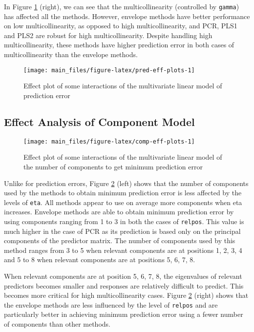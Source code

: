 \documentclass[review]{elsarticle}
\begin{document}
In Figure \ref{fig:pred-eff-plots} (right), we can see that the multicollinearity (controlled by \texttt{gamma}) has affected all the methods. However, envelope methods have better performance on low multicollinearity, as opposed to high multicollinearity, and PCR, PLS1 and PLS2 are robust for high multicollinearity. Despite handling high multicollinearity, these methods have higher prediction error in both cases of multicollinearity than the envelope methods.



\begin{figure}
\texttt{[image: main\_files/figure-latex/pred-eff-plots-1]} \caption{Effect plot of some interactions of the multivariate linear model of prediction error}\label{fig:pred-eff-plots}
\end{figure}

\hypertarget{effect-analysis-of-component-model}{%
\subsection{Effect Analysis of Component Model}\label{effect-analysis-of-component-model}}



\begin{figure}[!htb]
\texttt{[image: main\_files/figure-latex/comp-eff-plots-1]} \caption{Effect plot of some interactions of the multivariate linear model of the number of components to get minimum prediction error}\label{fig:comp-eff-plots}
\end{figure}

Unlike for prediction errors, Figure \ref{fig:comp-eff-plots} (left) shows that the number of components used by the methods to obtain minimum prediction error is less affected by the levels of \texttt{eta}. All methods appear to use on average more components when eta increases. Envelope methods are able to obtain minimum prediction error by using components ranging from 1 to 3 in both the cases of \texttt{relpos}. This value is much higher in the case of PCR as its prediction is based only on the principal components of the predictor matrix. The number of components used by this method ranges from 3 to 5 when relevant components are at positions 1, 2, 3, 4 and 5 to 8 when relevant components are at positions 5, 6, 7, 8.

When relevant components are at position 5, 6, 7, 8, the eigenvalues of relevant predictors becomes smaller and responses are relatively difficult to predict. This becomes more critical for high multicollinearity cases. Figure \ref{fig:comp-eff-plots} (right) shows that the envelope methods are less influenced by the level of \texttt{relpos} and are particularly better in achieving minimum prediction error using a fewer number of components than other methods.
\end{document}

